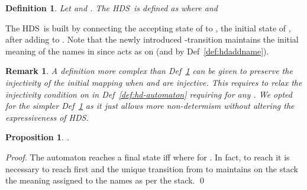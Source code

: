 \documentclass[runningheads,a4paper]{llncs}
\newcommand{\longversion}[1]{#1}
\newcommand{\hdns}{HDS}
\newtheorem{definition}{Theorem}[section]
\newtheorem{proposition}{Theorem}[section]
\newtheorem{remark}{Theorem}[section]
\newtheorem{definition}{Definition}[section]
\newtheorem{proposition}{Proposition}[section]
\newtheorem{remark}{Remark}[section]
\begin{document}
\begin{definition}\label{def:hdcomp}
  Let  and
  .
The \hdns\  is defined as
   where
   and
  
\end{definition}
The \hdns\  is built by
connecting the accepting state of  to , the
initial state of , after adding  to
.
Note that the newly introduced -transition maintains the
initial meaning of the names in  since 
acts as  on  (and by
Def~\ref{def:hdaddname}).
\begin{remark}\label{rmk:eta}
  A definition more complex than Def~\ref{def:hdcomp} can be given to
  preserve the injectivity of the initial mapping  when
   and  are injective.
This requires to relax the injectivity condition on  in
  Def~\ref{def:hd-automaton} requiring  for any .
We opted for the simpler Def~\ref{def:hdcomp} as it just allows more
  non-determism without altering the expressiveness of \hdns.
\end{remark}
\begin{proposition}\label{prop:H1H2}
  .
\end{proposition}
\longversion{
  \begin{proof}
    The automaton  reaches a final
    state iff  where  for
    .
In fact, to reach  it is necessary to reach 
    first and the unique transition from  to 
    maintains on the stack the meaning assigned to the names
     as per the stack.
\qed
  \end{proof}
}
\end{document}
